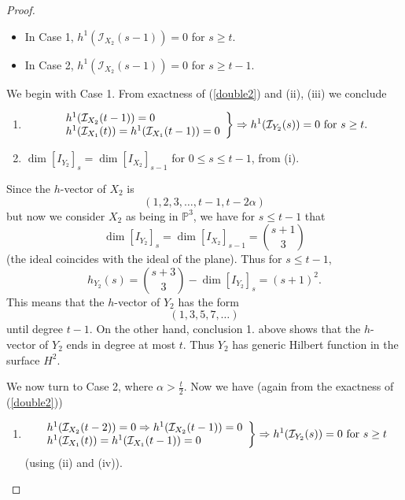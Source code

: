 \documentclass[10pt,a4paper]{amsart}
\begin{document}
\begin{proof}
\begin{itemize}
\item[(iii)] In Case 1, $h^1(\mathcal I_{X_2} (s-1)) = 0$ for $s \geq t$.

\item[(iv)] In Case 2, $h^1(\mathcal I_{X_2} (s-1)) = 0$ for $s \geq t-1$.
\end{itemize}

We begin with Case 1. From exactness of (\ref{double2}) and (ii), (iii) we conclude

\begin{enumerate}

\item 
\[
\left.
\begin{array}{l}
h^1(\mathcal I_{X_2}(t-1)) = 0 \\
h^1(\mathcal I_{X_1}(t)) = h^1(\mathcal I_{X_1}(t-1)) = 0
\end{array}
\right \}
\Rightarrow
h^1(\mathcal I_{Y_2}(s)) = 0 \hbox{ for } s \geq t.
\]



\item $\dim [I_{Y_2}]_s = \dim [I_{X_2}]_{s-1}$ for $0 \leq s \leq t-1$, from (i).
    
\end{enumerate}

Since the $h$-vector of $X_2$ is
\[
(1,2,3,\dots,t-1,t-2\alpha)
\]
but now we consider $X_2$ as being in $\mathbb P^3$, we have for $s \leq t-1$ that 
\begin{equation} \label{dimY2}
\dim [I_{Y_2}]_s = \dim [I_{X_2}]_{s-1} =  \binom{s+1}{3} 
\end{equation}
(the ideal coincides with the ideal of the plane). 
Thus for $s \leq t-1$,
\[
h_{Y_2}(s) = \binom{s+3}{3} - \dim [I_{Y_2}]_s = (s+1)^2.
\]
This means that the $h$-vector of ${Y_2}$ has the form
\[
(1,3,5,7,\dots)
\]
until degree $t-1$. On the other hand, conclusion 1. above shows that the $h$-vector of $Y_2$ ends in degree at most $t$. Thus $Y_2$ has generic Hilbert function in the surface $H^2$. 


We now turn to Case 2, {where $\alpha > \frac{t}{2}$.} Now we have (again from the exactness of (\ref{double2}))

\begin{enumerate}

    \item 
    \[
    \left. 
\begin{array}{l}
h^1(\mathcal I_{X_2}(t-2)) = 0 \Rightarrow h^1(\mathcal I_{X_2}(t-1)) = 0 \\
h^1(\mathcal I_{X_1}(t)) = h^1(\mathcal I_{X_1}(t-1)) = 0
\end{array}
\right \}
\Rightarrow h^1(\mathcal I_{Y_2}(s)) = 0 \hbox{ for } s \geq t
    \]
    (using (ii) and (iv)).


\end{enumerate}
\end{proof}
\end{document}
